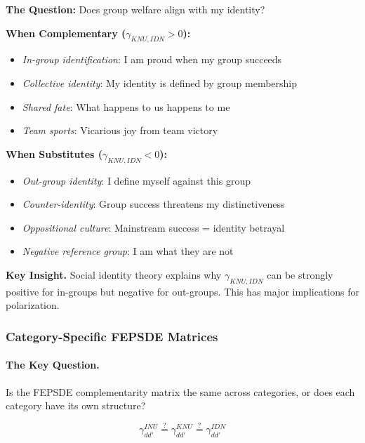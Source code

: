 \textbf{The Question:} Does group welfare align with my identity?

\textbf{When Complementary ($\gamma_{KNU,IDN} > 0$):}
\begin{itemize}
    \item \textit{In-group identification}: I am proud when my group succeeds
    \item \textit{Collective identity}: My identity is defined by group membership
    \item \textit{Shared fate}: What happens to us happens to me
    \item \textit{Team sports}: Vicarious joy from team victory
\end{itemize}

\textbf{When Substitutes ($\gamma_{KNU,IDN} < 0$):}
\begin{itemize}
    \item \textit{Out-group identity}: I define myself against this group
    \item \textit{Counter-identity}: Group success threatens my distinctiveness
    \item \textit{Oppositional culture}: Mainstream success = identity betrayal
    \item \textit{Negative reference group}: I am what they are not
\end{itemize}

\textbf{Key Insight.}
Social identity theory \citep{tajfel1979integrative} explains why 
$\gamma_{KNU,IDN}$ can be strongly positive for in-groups but negative 
for out-groups. This has major implications for polarization.

\subsubsection{Category-Specific FEPSDE Matrices}
\label{sec:category-specific-fepsde}

\paragraph{The Key Question.}
Is the FEPSDE complementarity matrix the same across categories, or does 
each category have its own structure?

\begin{equation}
\gamma^{INU}_{dd'} \stackrel{?}{=} \gamma^{KNU}_{dd'} \stackrel{?}{=} \gamma^{IDN}_{dd'}
\end{equation}

